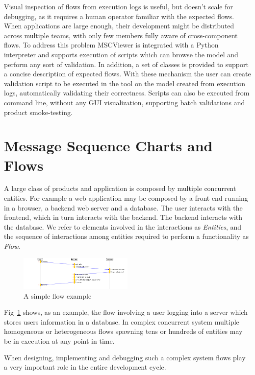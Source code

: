 \documentclass[11pt, twoside, titlepage]{book}
\newcommand{\prog}{MSCViewer}
\newcommand{\defterm}[1]{\textit{#1}\index{#1}}
\begin{document}
Visual inspection of flows from execution logs is useful, but doesn't scale for
debugging, as it requires a human operator familiar with the expected flows.
When applications are large enough, their development might be distributed
across multiple teams, with only few members fully aware of cross-component
flows. To address this problem \prog{} is integrated with a Python interpreter
and supports execution of scripts which can browse the model and perform any
sort of validation. In addition, a set of classes is provided to support a
concise description of expected flows. With these mechanism the user can create
validation script to be executed in the tool on the model created from execution
logs, automatically validating their correctness. Scripts can also be executed
from command line, without any GUI visualization, supporting batch validations
and product smoke-testing.

\section{Message Sequence Charts and Flows}
A large class of products and application is composed by multiple concurrent
entities. For example a web application may be composed by a front-end running
in a browser, a backend web server and a database. The user interacts with the 
frontend, which in turn interacts with the backend. The backend interacts with
the database. We refer to elements involved in the interactions as 
\defterm{Entities}, and the sequence of interactions among entities required to
perform a functionality as \defterm{Flow}. 

\begin{figure}[ht!]
  \centering
  \includegraphics[width=0.5\textwidth,natwidth=1024,natheight=600]{simple-flow.png}
  \caption{A simple flow example}
  \label{fig:simple-flow} 
\end{figure}  
 
Fig~\ref{fig:simple-flow} shows, as an example, the flow involving a user
logging into a server which stores users information in a database. 
In complex concurrent system multiple homogeneous or heterogeneous flows
spawning tens or hundreds of entities may be in execution at any point in time.  
  
When designing, implementing and debugging such a complex system flows play a
very important role in the entire development cycle. 
\end{document}
